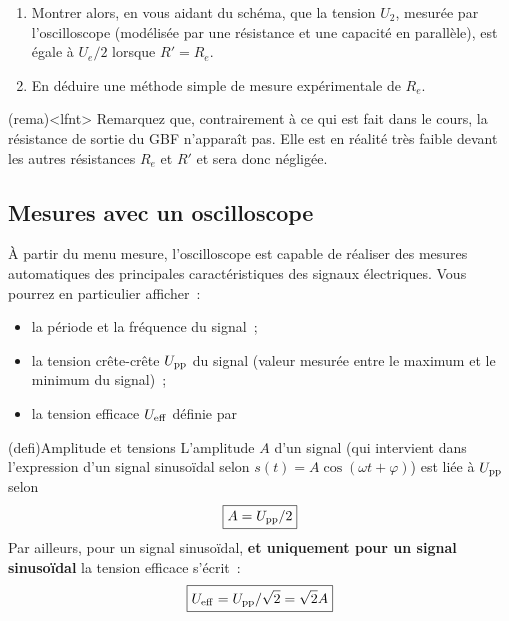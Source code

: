 \documentclass[../main/main.tex]{subfiles}
\begin{document}
\begin{enumerate}[label=\clenumi, start=3]
	\item Montrer alors, en vous aidant du schéma, que la tension $U_2$, mesurée
	      par l'oscilloscope (modélisée par une résistance et une capacité en
	      parallèle), est égale à $U_{e}/2$ lorsque $R' = R_{e}$.
	\item En déduire une méthode simple de mesure expérimentale de $R_{e}$.
\end{enumerate}

\begin{tcb}(rema)<lfnt>{}
	Remarquez que, contrairement à ce qui est fait dans le cours, la résistance de
	sortie du GBF n'apparaît pas. Elle est en réalité très faible devant les
	autres résistances $R_{e}$ et $R'$ et sera donc négligée.
\end{tcb}

\subsection{Mesures avec un oscilloscope}

À partir du menu mesure, l'oscilloscope est capable de réaliser des mesures
automatiques des principales caractéristiques des signaux électriques. Vous
pourrez en particulier afficher~:

\begin{itemize}
	\item la période et la fréquence du signal~;
	\item la tension crête-crête $U_{\rm pp}$ du signal (valeur mesurée entre le
	      maximum et le minimum du signal)~;
	\item la tension efficace $U_{\rm eff}$ définie par
\end{itemize}
\vspace{-10pt}
\begin{tcb}[sidebyside](defi){Amplitude et tensions}
	L'amplitude $A$ d'un signal (qui intervient dans l'expression d'un signal
	sinusoïdal selon $s(t) = A \cos(\omega t + \varphi)$) est liée à $U_{\rm
				pp}$ selon
	\[
		\boxed{A = U_{\rm pp}/2}
	\]
	\tcblower
	Par ailleurs, pour un signal sinusoïdal, \textbf{et uniquement pour un
		signal sinusoïdal} la tension efficace s'écrit~:
	\[
		\boxed{U_{\rm eff} = U_{\rm pp}/\sqrt{2} = \sqrt{2} A}
	\]
\end{tcb}
\end{document}
